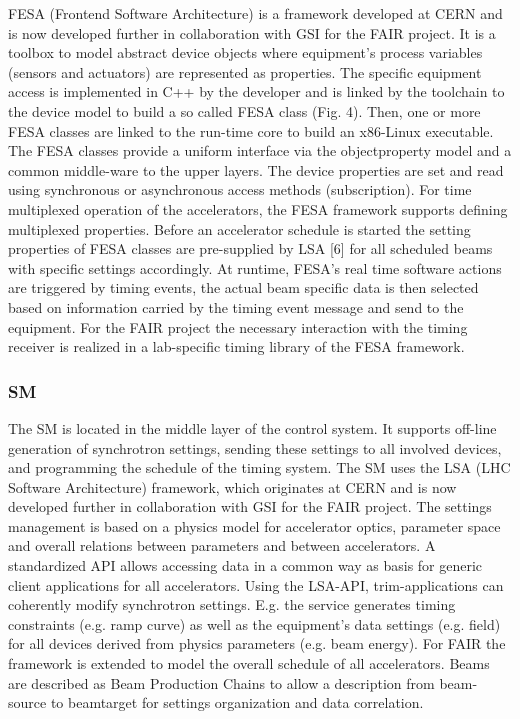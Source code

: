 FESA (Frontend Software Architecture) is a framework developed at CERN and is now developed further in collaboration with GSI for the FAIR project. It is a toolbox to model abstract device objects where equipment’s process variables (sensors and actuators) are represented as properties. The specific equipment access is implemented in C++ by the developer and is linked by the toolchain
to the device model to build a so called FESA class (Fig. 4). Then, one or more FESA classes are linked to the run-time core to build an x86-Linux executable. The
FESA classes provide a uniform interface via the objectproperty model and a common middle-ware to the upper layers. The device properties are set and read using synchronous or asynchronous access methods (subscription). For time multiplexed operation of the accelerators, the FESA framework supports defining multiplexed properties. Before an accelerator schedule is started the setting properties of FESA classes are pre-supplied by LSA [6] for all scheduled beams with specific settings accordingly. At runtime, FESA’s real time software actions are triggered by timing events, the actual beam specific data is then selected based on information carried by the timing event message and send to the equipment. For the FAIR project the necessary interaction with the timing receiver is realized in a
lab-specific timing library of the FESA framework.


\subsubsection{SM}
The \gls{SM} is located in the middle layer of the control system. It supports off-line generation of synchrotron settings, sending these settings to all involved devices,
and programming the schedule of the timing system. The SM uses the LSA (LHC Software Architecture) framework, which originates at CERN and is now developed further in collaboration with GSI for the FAIR project. The settings management is based on a physics model for accelerator optics, parameter space and overall relations between parameters and between accelerators. A standardized API allows accessing data in a common way as basis for generic client applications for all accelerators. Using the LSA-API, trim-applications can coherently modify synchrotron settings. E.g. the service generates timing constraints (e.g. ramp curve) as well as the equipment’s data settings (e.g. field) for all devices derived from physics parameters (e.g. beam energy). For FAIR the framework is extended to model the overall schedule of all accelerators. Beams are described as Beam Production
Chains to allow a description from beam-source to beamtarget for settings organization and data correlation.

